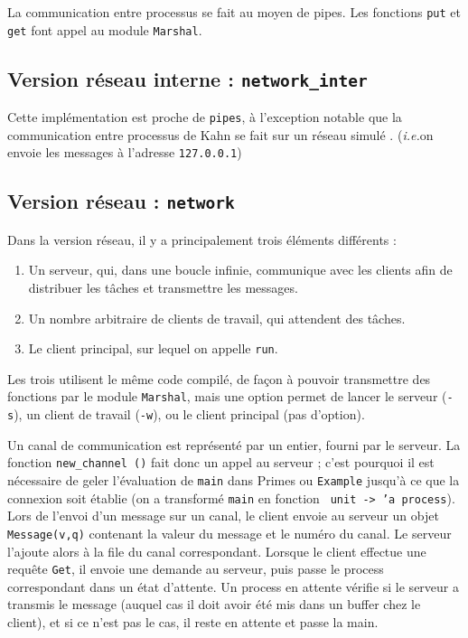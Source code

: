 \documentclass[11pt,a4paper]{article}
\newcommand{\ie}{\textit{i.e.}}
\renewcommand{\tt}[1]{\texttt{#1}}
\begin{document}
La communication entre processus se fait au moyen de pipes. Les fonctions
\tt{put} et \tt{get} font appel au module \tt{Marshal}. 

\subsection{Version réseau interne : \tt{network\_inter}}

Cette implémentation est proche de \tt{pipes}, à l'exception notable que
la communication entre processus de Kahn se fait sur un réseau \og simulé \fg{}.
(\ie on envoie les messages à l'adresse \tt{127.0.0.1})

\subsection{Version réseau : \texttt{network}}

Dans la version réseau, il y a principalement trois éléments différents :
\begin{enumerate}

\item Un serveur, qui, dans une boucle infinie, communique avec les clients afin de
distribuer les tâches et transmettre les messages.
\item Un nombre arbitraire de clients de travail, qui attendent des tâches.
\item Le client principal, sur lequel on appelle \tt{run}.


\end{enumerate}

Les trois utilisent le même code compilé, de façon à pouvoir transmettre des
fonctions par le module \tt{Marshal}, mais une option permet de lancer le serveur
(\tt{-s}), un client de travail (\tt{-w}), ou le client principal (pas d'option).

Un canal de communication est représenté par un entier, fourni par le serveur.
La fonction \tt{new\_channel ()} fait donc un appel au serveur ; c'est pourquoi il
est nécessaire de geler l'évaluation de \tt{main} dans Primes ou \tt{Example} jusqu'à ce
que la connexion soit établie (on a transformé \tt{main} en fonction \tt{
unit -> 'a process}). Lors de l'envoi d'un message sur un canal, le client envoie
au serveur un objet \tt{Message(v,q)} contenant la valeur du message et le numéro du
canal. Le serveur l'ajoute alors à la file du canal correspondant. Lorsque le
client effectue une requête \tt{Get}, il envoie une demande au serveur, puis passe
le process correspondant dans un état d'attente. Un process en attente vérifie
si le serveur a transmis le message (auquel cas il doit avoir été mis dans un
buffer chez le client), et si ce n'est pas le cas, il reste en attente et
passe la main.
\end{document}
